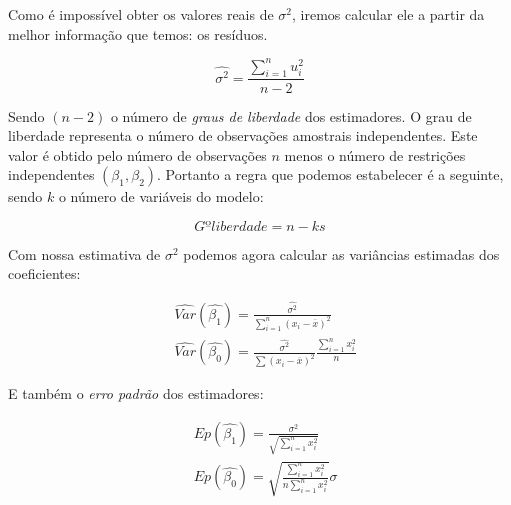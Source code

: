 \documentclass[12pt,a4paper,oneside,brazil]{abntex2}
\begin{document}
Como é impossível obter os valores reais de $\sigma^2$, iremos calcular ele a partir da melhor informação que temos: os resíduos.

\begin{equation}
   \hat{\sigma^2} = \frac{\sum \limits^{n}_{i = 1} u_i ^2}{n - 2}
 \end{equation} 
 
Sendo $( n - 2 )$ o número de \textit{graus de liberdade} dos estimadores. O grau de liberdade representa o número de observações amostrais independentes. Este valor é obtido pelo número de observações $n$ menos o número de restrições independentes $(\beta_1, \beta_2)$. Portanto a regra que podemos estabelecer é a seguinte, sendo $k$ o número de variáveis do modelo:

\begin{equation}
Gº liberdade = n - ks   
\end{equation}

Com nossa estimativa de $\sigma^2$ podemos agora calcular as variâncias estimadas dos coeficientes:

\begin{align}
& \hat{Var} (\hat{\beta_1}) = \frac{\hat{\sigma^2}}{\sum \limits^{n}_{i = 1} (x_i - \overline{x})^2} \\
& \hat{Var}(\hat{\beta_0}) = \frac{\hat{\sigma^2}}{\sum \limits (x_i - \overline{x})^2} \frac{\sum \limits^{n}_{i = 1} x_i^2}{n}
\end{align}

E também o \textit{erro padrão} dos estimadores:

\begin{align}
    & Ep (\hat{\beta_1}) = \frac{\sigma^2}{\sqrt{\sum \limits^{n}_{i=1} x_i^2}} \\
    & Ep (\hat{\beta_0}) = \sqrt{\frac{\sum \limits^{n}_{i=1} x_i^2}{n \sum \limits^{n}_{i=1} x_i^2}} \sigma
\end{align}

\printbibliography
\end{document}
